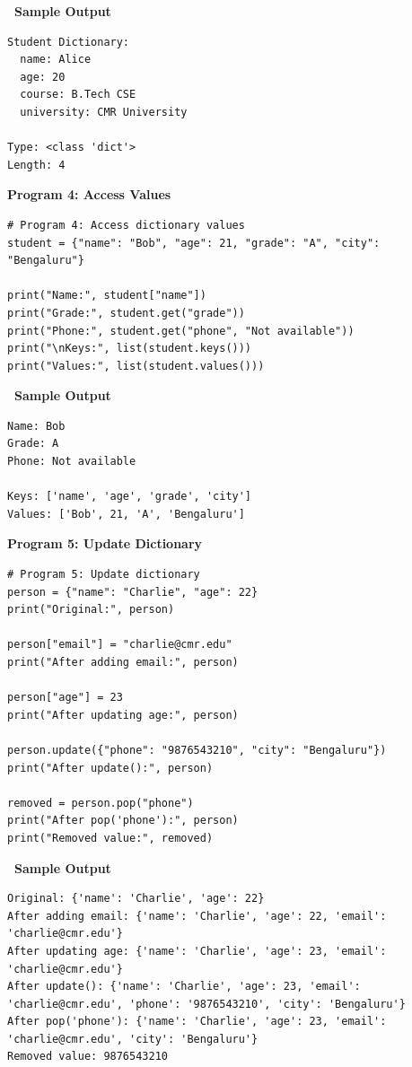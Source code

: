 \documentclass[12pt,a4paper]{article}
\newcommand{\outhead}{\noindent\colorbox{cmrgreen!25}%
  {\textbf{\small\color{cmrdark}~Sample Output~}}\par\vspace{-1pt}}
\begin{document}
\outhead
\begin{lstlisting}[style=outputstyle]
Student Dictionary:
  name: Alice
  age: 20
  course: B.Tech CSE
  university: CMR University

Type: <class 'dict'>
Length: 4
\end{lstlisting}

\vspace{0.5cm}

\textbf{Program 4: Access Values}

\begin{lstlisting}
# Program 4: Access dictionary values
student = {"name": "Bob", "age": 21, "grade": "A", "city": "Bengaluru"}

print("Name:", student["name"])
print("Grade:", student.get("grade"))
print("Phone:", student.get("phone", "Not available"))
print("\nKeys:", list(student.keys()))
print("Values:", list(student.values()))
\end{lstlisting}

\outhead
\begin{lstlisting}[style=outputstyle]
Name: Bob
Grade: A
Phone: Not available

Keys: ['name', 'age', 'grade', 'city']
Values: ['Bob', 21, 'A', 'Bengaluru']
\end{lstlisting}

\vspace{0.5cm}

\textbf{Program 5: Update Dictionary}

\begin{lstlisting}
# Program 5: Update dictionary
person = {"name": "Charlie", "age": 22}
print("Original:", person)

person["email"] = "charlie@cmr.edu"
print("After adding email:", person)

person["age"] = 23
print("After updating age:", person)

person.update({"phone": "9876543210", "city": "Bengaluru"})
print("After update():", person)

removed = person.pop("phone")
print("After pop('phone'):", person)
print("Removed value:", removed)
\end{lstlisting}

\outhead
\begin{lstlisting}[style=outputstyle]
Original: {'name': 'Charlie', 'age': 22}
After adding email: {'name': 'Charlie', 'age': 22, 'email': 'charlie@cmr.edu'}
After updating age: {'name': 'Charlie', 'age': 23, 'email': 'charlie@cmr.edu'}
After update(): {'name': 'Charlie', 'age': 23, 'email': 'charlie@cmr.edu', 'phone': '9876543210', 'city': 'Bengaluru'}
After pop('phone'): {'name': 'Charlie', 'age': 23, 'email': 'charlie@cmr.edu', 'city': 'Bengaluru'}
Removed value: 9876543210
\end{lstlisting}
\end{document}
